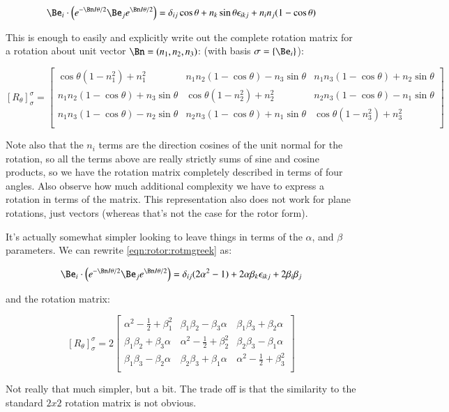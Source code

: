 \begin{equation}\label{eqn:rotor:rotmn}
\Be_i \cdot \left(e^{-\Bn I \theta/2} \Be_j e^{\Bn I \theta/2}\right)
= \delta_{ij}\cos\theta
+ n_k \sin{\theta} \epsilon_{ikj} + n_i n_j (1-\cos\theta)
\end{equation}

This is enough to easily and explicitly write out the complete rotation matrix for a rotation about unit vector $\Bn = (n_1, n_2, n_3)$:
(with basis $\sigma = \{\Be_i\}$):

\[
[
R_\theta
]_\sigma^\sigma
=
\begin{bmatrix}
\cos\theta(1 -n_1^2) + n_1^2 & n_1 n_2 (1-\cos\theta) - n_3 \sin\theta & n_1 n_3 (1-\cos\theta) + n_2 \sin\theta \\
n_1 n_2 (1-\cos\theta) + n_3 \sin\theta & \cos\theta(1 -n_2^2) + n_2^2 & n_2 n_3 (1-\cos\theta) - n_1 \sin\theta \\
n_1 n_3 (1-\cos\theta) - n_2 \sin\theta & n_2 n_3 (1-\cos\theta) + n_1 \sin\theta & \cos\theta(1 -n_3^2) + n_3^2 \\
\end{bmatrix}
\]

Note also that the $n_i$ terms are the direction cosines of the unit normal for the rotation, so all the terms above
are really strictly sums of sine and cosine products, so we have the rotation matrix completely described in terms of four
angles.  Also observe how much additional complexity we have to express a rotation in terms of the matrix.  This representation also
does not work for plane rotations, just vectors (whereas that's not the case for the rotor form).

It's actually somewhat simpler looking to leave things in terms of the $\alpha$, and $\beta$ parameters.  We can rewrite
\ref{eqn:rotor:rotmgreek} as:

\begin{equation}
\Be_i \cdot \left(e^{-\Bn I \theta/2} \Be_j e^{\Bn I \theta/2}\right)
= \delta_{ij}(2\alpha^2 -1)
+2\alpha \beta_k \epsilon_{ikj} + 2\beta_i\beta_j
\end{equation}

and the rotation matrix:

\[
[
R_\theta
]_\sigma^\sigma
=
2
\begin{bmatrix}
\alpha^2 -\frac{1}{2} + \beta_1^2 & \beta_1 \beta_2  - \beta_3 \alpha & \beta_1 \beta_3  + \beta_2 \alpha \\
\beta_1 \beta_2  + \beta_3 \alpha & \alpha^2 -\frac{1}{2} + \beta_2^2 & \beta_2 \beta_3  - \beta_1 \alpha \\
\beta_1 \beta_3  - \beta_2 \alpha & \beta_2 \beta_3  + \beta_1 \alpha & \alpha^2 -\frac{1}{2} + \beta_3^2 \\
\end{bmatrix}
\]

Not really that much simpler, but a bit.  The trade off is that the similarity to the standard $2x2$ rotation matrix is not obvious.

